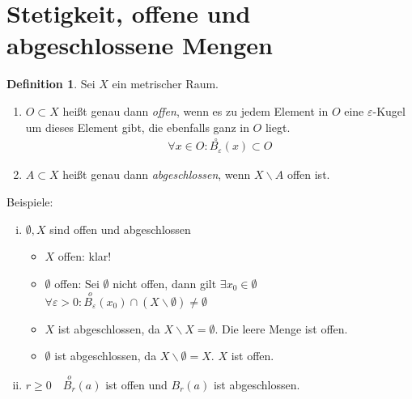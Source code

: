 \documentclass[ngerman,titlepage,twoside, parskip=half*]{scrreprt}
\theoremstyle{plain}
\theoremstyle{definition}
\newtheorem{definition}{Definition}
\theoremstyle{remark}
\begin{document}
\section{Stetigkeit, offene und abgeschlossene Mengen}
\begin{definition}
Sei $X$ ein metrischer Raum.
\begin{enumerate}[(1)]
\item $O\subset X$ heißt genau dann \emph{offen},
  wenn es zu jedem Element in $O$ eine $\varepsilon$-Kugel um dieses
  Element gibt, die ebenfalls ganz in $O$ liegt.
  \begin{gather*}\forall x\in O\colon\stackrel{\circ}{B_{\varepsilon}}(x)\subset O\end{gather*}
\item $A\subset X$ heißt genau dann
  \emph{abgeschlossen}, wenn
  $X\backslash A$ offen ist.
\end{enumerate}
\end{definition}
Beispiele:
\begin{enumerate}[(i)]
  \item $\emptyset, X$ sind offen und abgeschlossen
    \begin{itemize}
      \item $X$ offen: klar!
      \item $\emptyset$ offen: Sei $\emptyset$ nicht offen, dann gilt
        $\exists x_0\in \emptyset$ \lightning $\forall \varepsilon>0\colon
        \stackrel{o}{B_{\varepsilon}}(x_0)\cap (X\backslash
        \emptyset)\neq \emptyset$\lightning 
      \item $X$ ist abgeschlossen, da $X\backslash X=\emptyset$. Die leere Menge ist offen.
      \item $\emptyset$ ist abgeschlossen, da $X\backslash \emptyset=X$. $X$ ist offen.
    \end{itemize}
  \item $r\geq 0\quad \stackrel{o}{B_r}(a)$ ist offen und $B_r(a)$ ist abgeschlossen.
\end{enumerate}
\end{document}
